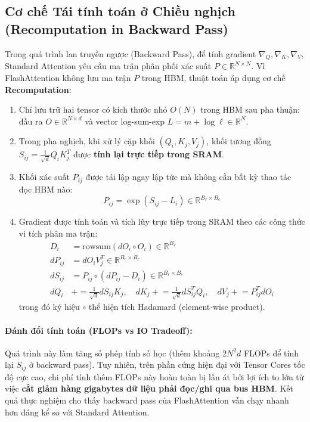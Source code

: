 \documentclass[10pt,a4paper]{article}
\begin{document}
\subsection{Cơ chế Tái tính toán ở Chiều nghịch (Recomputation in Backward Pass)}
Trong quá trình lan truyền ngược (Backward Pass), để tính gradient $\nabla_Q, \nabla_K, \nabla_V$, Standard Attention yêu cầu ma trận phân phối xác suất $P \in \mathbb{R}^{N \times N}$. Vì FlashAttention không lưu ma trận $P$ trong HBM, thuật toán áp dụng cơ chế \textbf{Recomputation}:
\begin{enumerate}
    \item Chỉ lưu trữ hai tensor có kích thước nhỏ $O(N)$ trong HBM sau pha thuận: đầu ra $O \in \mathbb{R}^{N \times d}$ và vector log-sum-exp $L = m + \log \ell \in \mathbb{R}^N$.
    \item Trong pha nghịch, khi xử lý cặp khối $(Q_i, K_j, V_j)$, khối tương đồng $S_{ij} = \frac{1}{\sqrt{d}} Q_i K_j^T$ được \textbf{tính lại trực tiếp trong SRAM}.
    \item Khối xác suất $P_{ij}$ được tái lập ngay lập tức mà không cần bất kỳ thao tác đọc HBM nào:
    \begin{equation}
    P_{ij} = \exp\left(S_{ij} - L_i\right) \in \mathbb{R}^{B_r \times B_c}
    \end{equation}
    \item Gradient được tính toán và tích lũy trực tiếp trong SRAM theo các công thức vi tích phân ma trận:
    \begin{align}
    D_i &= \text{rowsum}(dO_i \circ O_i) \in \mathbb{R}^{B_r} \\
    dP_{ij} &= dO_i V_j^T \in \mathbb{R}^{B_r \times B_c} \\
    dS_{ij} &= P_{ij} \circ (dP_{ij} - D_i) \in \mathbb{R}^{B_r \times B_c} \\
    dQ_i &\mathrel{+}= \frac{1}{\sqrt{d}} dS_{ij} K_j, \quad dK_j \mathrel{+}= \frac{1}{\sqrt{d}} dS_{ij}^T Q_i, \quad dV_j \mathrel{+}= P_{ij}^T dO_i
    \end{align}
    trong đó ký hiệu $\circ$ thể hiện tích Hadamard (element-wise product).
\end{enumerate}

\paragraph{Đánh đổi tính toán (FLOPs vs IO Tradeoff):} Quá trình này làm tăng số phép tính số học (thêm khoảng $2N^2 d$ FLOPs để tính lại $S_{ij}$ ở backward pass). Tuy nhiên, trên phần cứng hiện đại với Tensor Cores tốc độ cực cao, chi phí tính thêm FLOPs này hoàn toàn bị lấn át bởi lợi ích to lớn từ việc \textbf{cắt giảm hàng gigabytes dữ liệu phải đọc/ghi qua bus HBM}. Kết quả thực nghiệm cho thấy backward pass của FlashAttention vẫn chạy nhanh hơn đáng kể so với Standard Attention.
\end{document}
